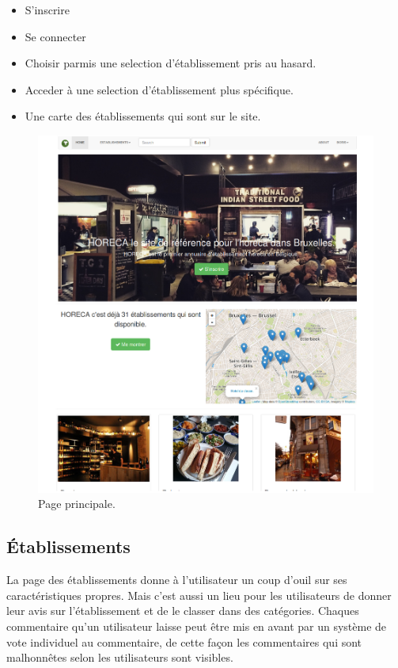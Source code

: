 \documentclass[a4paper,10pt]{article}
\begin{document}
\begin{itemize}
    \item S'inscrire
    \item Se connecter
    \item Choisir parmis une selection d'établissement pris au hasard.
    \item Acceder à une selection d'établissement plus spécifique.
    \item Une carte des établissements qui sont sur le site.
\end{itemize}

\begin{figure}[hbt]
  \centering
  \includegraphics[scale=0.2]{./images/main.png}
  \caption{Page principale.}
\end{figure}

\subsection{Établissements}
La page des établissements donne à l'utilisateur un coup d'ouil sur ses
caractéristiques propres. Mais c'est aussi un lieu pour les utilisateurs de
donner leur avis sur l'établissement et de le classer dans des catégories.
Chaques commentaire qu'un utilisateur laisse peut être mis en avant par un
système de vote individuel au commentaire, de cette façon les commentaires qui
sont malhonnêtes selon les utilisateurs sont visibles.
\end{document}
